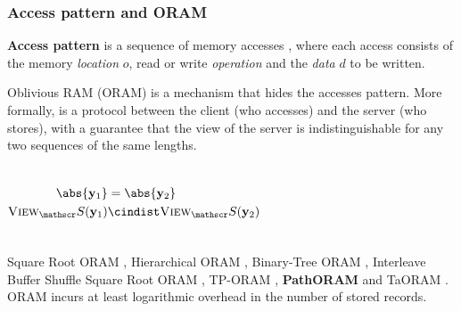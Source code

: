 	\begin{frame}[label={frame:appendix:oram}]

		\frametitle{Access pattern and ORAM}

		\justifying%

		\textbf{Access pattern} is a sequence of memory accesses \oramProgram{}, where each access consists of the memory \emph{location} $o$, read \oramRead{} or write \oramWrite{} \emph{operation} and the \emph{data} $d$ to be written.

		Oblivious RAM (ORAM) is a mechanism that hides the accesses pattern.
		More formally, \oram{} is a protocol between the client \client{} (who accesses) and the server \server{} (who stores), with a guarantee that the view of the server is indistinguishable for any two sequences of the same lengths.

		\begin{columns}[T]

				\[
					\begin{split}
						\abs{\oramProgram_1}					& = \abs{\oramProgram_2}							\\
						\textsc{View}_\server (\oramProgram_1)	& \cindist \textsc{View}_\server (\oramProgram_2)
					\end{split}
				\]



		\end{columns}

		\vspace*{1ex}

		Square Root ORAM \cite{oram-theory}, Hierarchical ORAM \cite{oram-original}, Binary-Tree ORAM \cite{binary-tree-oram}, Interleave Buffer Shuffle Square Root ORAM \cite{shortest-path-oram}, TP-ORAM \cite{tp-oram}, \textbf{PathORAM} \cite{path-oram} and TaORAM \cite{taostore}.
		\alert{ORAM incurs at least logarithmic overhead in the number of stored records. \cite{oram-original}}

		\begin{flushright}
			\hyperlink{frame:epsolute-motivation}{}
		\end{flushright}

	\end{frame}

